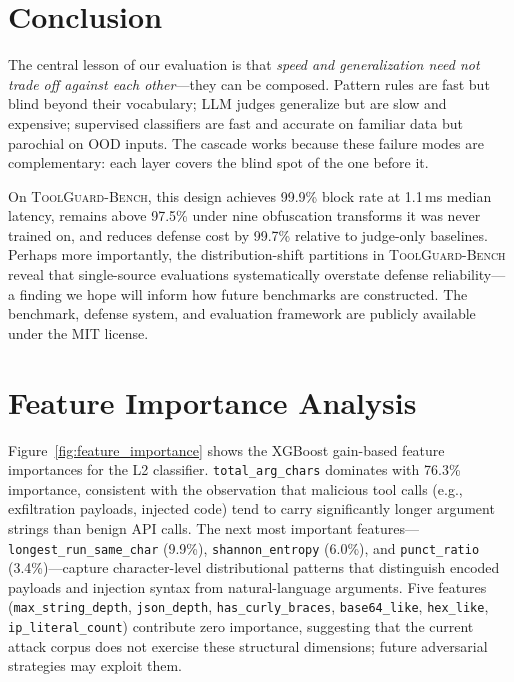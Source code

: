 \documentclass{article}
\newcommand{\bench}{\textsc{ToolGuard-Bench}\xspace}
\begin{document}
\section{Conclusion}

The central lesson of our evaluation is that \emph{speed and generalization need not trade off against each other}---they can be composed.
Pattern rules are fast but blind beyond their vocabulary; LLM judges generalize but are slow and expensive; supervised classifiers are fast and accurate on familiar data but parochial on OOD inputs.
The cascade works because these failure modes are complementary: each layer covers the blind spot of the one before it.

On \bench, this design achieves 99.9\% block rate at 1.1\,ms median latency, remains above 97.5\% under nine obfuscation transforms it was never trained on, and reduces defense cost by 99.7\% relative to judge-only baselines.
Perhaps more importantly, the distribution-shift partitions in \bench reveal that single-source evaluations systematically overstate defense reliability---a finding we hope will inform how future benchmarks are constructed.
The benchmark, defense system, and evaluation framework are publicly available under the MIT license.




\newpage
\appendix
\onecolumn

\section{Feature Importance Analysis}
\label{app:feature_importance}

Figure~\ref{fig:feature_importance} shows the XGBoost gain-based feature importances for the L2 classifier.
\texttt{total\_arg\_chars} dominates with 76.3\% importance, consistent with the observation that malicious tool calls (e.g., exfiltration payloads, injected code) tend to carry significantly longer argument strings than benign API calls.
The next most important features---\texttt{longest\_run\_same\_char} (9.9\%), \texttt{shannon\_entropy} (6.0\%), and \texttt{punct\_ratio} (3.4\%)---capture character-level distributional patterns that distinguish encoded payloads and injection syntax from natural-language arguments.
Five features (\texttt{max\_string\_depth}, \texttt{json\_depth}, \texttt{has\_curly\_braces}, \texttt{base64\_like}, \texttt{hex\_like}, \texttt{ip\_literal\_count}) contribute zero importance, suggesting that the current attack corpus does not exercise these structural dimensions; future adversarial strategies may exploit them.
\end{document}
